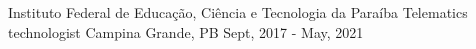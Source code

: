 
\begin{cventries}
  \cventry
  {Instituto Federal de Educação, Ciência e Tecnologia da Paraíba} %
  {Telematics technologist} %
  {Campina Grande, PB} %
  {Sept, 2017 - May, 2021} %
  {}
\end{cventries}
